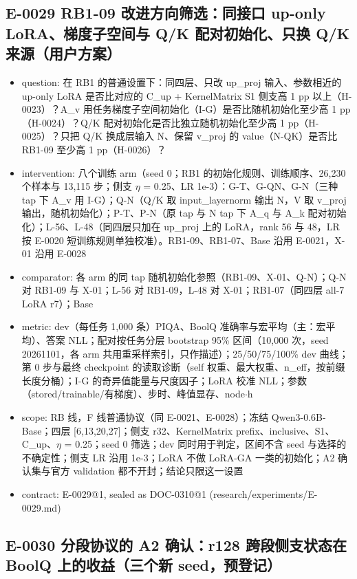 \documentclass[11pt]{article}
\begin{document}
\subsection*{E-0029 RB1-09 改进方向筛选：同接口 up-only LoRA、梯度子空间与 Q/K 配对初始化、只换 Q/K 来源（用户方案）}

\begin{itemize}
\item question: 在 RB1 的普通设置下：同四层、只改 up\_proj 输入、参数相近的 up-only LoRA 是否比对应的 C\_up + KernelMatrix S1 侧支高 1 pp 以上（H-0023）？A\_v 用任务梯度子空间初始化（I-G）是否比随机初始化至少高 1 pp（H-0024）？Q/K 配对初始化是否比独立随机初始化至少高 1 pp（H-0025）？只把 Q/K 换成层输入 N、保留 v\_proj 的 value（N-QK）是否比 RB1-09 至少高 1 pp（H-0026）？
\item intervention: 八个训练 arm（seed 0；RB1 的初始化规则、训练顺序、26,230 个样本与 13,115 步；侧支 \ensuremath{\eta} = 0.25、LR 1e-3）：G-T、G-QN、G-N（三种 tap 下 A\_v 用 I-G）；Q-N（Q/K 取 input\_layernorm 输出 N，V 取 v\_proj 输出，随机初始化）；P-T、P-N（原 tap 与 N tap 下 A\_q 与 A\_k 配对初始化）；L-56、L-48（同四层只加在 up\_proj 上的 LoRA，rank 56 与 48，LR 按 E-0020 短训练规则单独校准）。RB1-09、RB1-07、Base 沿用 E-0021，X-01 沿用 E-0028
\item comparator: 各 arm 的同 tap 随机初始化参照（RB1-09、X-01、Q-N）；Q-N 对 RB1-09 与 X-01；L-56 对 RB1-09，L-48 对 X-01；RB1-07（同四层 all-7 LoRA r7）；Base
\item metric: dev（每任务 1,000 条）PIQA、BoolQ 准确率与宏平均（主：宏平均）、答案 NLL；配对按任务分层 bootstrap 95\% 区间（10,000 次，seed 20261101，各 arm 共用重采样索引，只作描述）；25/50/75/100\% dev 曲线；第 0 步与最终 checkpoint 的读取诊断（self 权重、最大权重、n\_eff，按前缀长度分桶）；I-G 的奇异值能量与尺度因子；LoRA 校准 NLL；参数（stored/trainable/有梯度）、步时、峰值显存、node\ensuremath{\cdot}h
\item scope: RB 线，F 线普通协议（同 E-0021、E-0028）；冻结 Qwen3-0.6B-Base；四层 [6,13,20,27]；侧支 r32、KernelMatrix prefix、inclusive、S1、C\_up、\ensuremath{\eta} = 0.25；seed 0 筛选；dev 同时用于判定，区间不含 seed 与选择的不确定性；侧支 LR 沿用 1e-3；LoRA 不做 LoRA-GA 一类的初始化；A2 确认集与官方 validation 都不开封；结论只限这一设置
\item contract: E-0029@1, sealed as DOC-0310@1 (research/experiments/E-0029.md)
\end{itemize}

\subsection*{E-0030 分段协议的 A2 确认：r128 跨段侧支状态在 BoolQ 上的收益（三个新 seed，预登记）}
\end{document}
